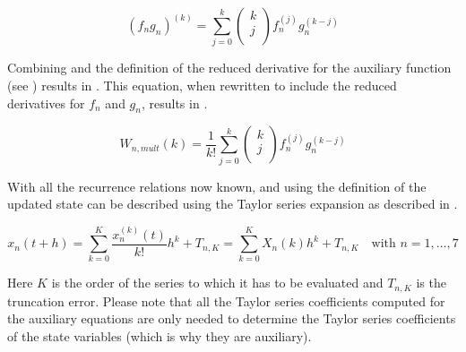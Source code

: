 \begin{equation} \label{eq:Leibniz}
\left(f_{n}g_{n}\right)^{\left( k\right)}=\displaystyle\sum_{j=0}^{k}
\left(
\begin{matrix}
k\\
j\\
\end{matrix}
\right)
f_{n}^{\left( j\right)}g_{n}^{\left( k-j\right)}
\end{equation}

Combining  and the definition of the reduced derivative for the auxiliary function (see ) results in . This equation, when rewritten to include the reduced derivatives for $f_{n}$ and $g_{n}$, results in .

\begin{equation} \label{eq:LeibnizInt}
W_{n,mult}\left(k\right)=\dfrac{1}{k!}\displaystyle\sum_{j=0}^{k}
\left(
\begin{matrix}
k\\
j\\
\end{matrix}
\right)
f_{n}^{\left( j\right)}g_{n}^{\left( k-j\right)}
\end{equation}

With all the recurrence relations now known, and using the definition of  the updated state can be described using the Taylor series expansion as described in .

\begin{equation} \label{eq:TSexp}
x_{n}\left(t+h\right)=\displaystyle\sum_{k=0}^{K}\dfrac{x_{n}^{\left( k\right)}\left(t\right)}{k!}h^{k}+T_{n,K}=\displaystyle\sum_{k=0}^{K}X_{n}\left( k \right) h^{k}+T_{n,K} \quad \text{with }n=1,\dotsc,7
\end{equation}

Here $K$ is the order of the series to which it has to be evaluated and $T_{n,K}$ is the truncation error. Please note that all the Taylor series coefficients computed for the auxiliary equations are only needed to determine the Taylor series coefficients of the state variables (which is why they are auxiliary).





%


%


